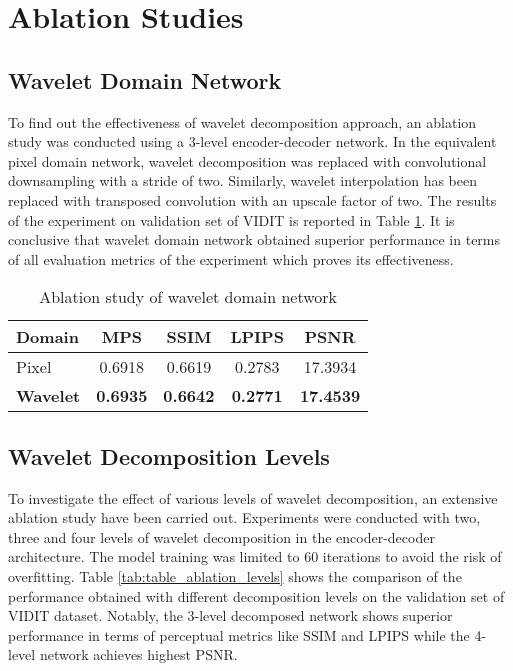 \documentclass[runningheads]{llncs}
\begin{document}
\section{Ablation Studies}
\label{section:ablation_studies}

\subsection{Wavelet Domain Network}
\label{subsection:wavelet_ablation}
To find out the effectiveness of wavelet decomposition approach, an ablation study was conducted using a 3-level encoder-decoder network. In the equivalent pixel domain network, wavelet decomposition was replaced with convolutional downsampling with a stride of two. Similarly, wavelet interpolation has been replaced with transposed convolution with an upscale factor of two. The results of the experiment on validation set of VIDIT is reported in Table \ref{tab:table_ablation_pixel}. It is conclusive that wavelet domain network obtained superior performance in terms of all evaluation metrics of the experiment which proves its effectiveness.

\begin{table}[h!]
\centering
\caption{Ablation study of wavelet domain network}
\begin{tabular}{l||c|c|c|c|}
Domain &\textbf{MPS}&SSIM&LPIPS&PSNR \\
\hline\hline
Pixel & 0.6918 & 0.6619 & 0.2783 & 17.3934 \\
\textbf{Wavelet} & \textbf{0.6935} & \textbf{0.6642} & \textbf{0.2771} & \textbf{17.4539}\\
\end{tabular}
\label{tab:table_ablation_pixel}
\end{table}

\subsection{Wavelet Decomposition Levels}
\label{subsection:decomposition_levels_ablation}
To investigate the effect of various levels of wavelet decomposition, an extensive ablation study have been carried out. Experiments were conducted with two, three and four levels of wavelet decomposition in the encoder-decoder architecture. The model training was limited to 60 iterations to avoid the risk of overfitting. Table \ref{tab:table_ablation_levels} shows the comparison of the performance obtained with different decomposition levels on the validation set of VIDIT dataset. Notably, the 3-level decomposed network shows superior performance in terms of perceptual metrics like SSIM and LPIPS while the 4-level network achieves highest PSNR.
\end{document}
